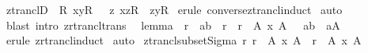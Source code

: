 \begin{isabellebody}
\isamarkupfalse%
%
\endisatagproof
{\isafoldproof}%
%
\isadelimproof
\isanewline
%
\endisadelimproof
\isanewline
{}\isamarkupfalse%
\ ztranclD\ {\isacharcolon}\ {\isachardoublequoteopen}{\isacharbang}{\isacharbang}R{\isachardot}\ {\isacharparenleft}x{\isacharcomma}y{\isacharparenright}{\isacharcolon}R{\isacharpercent}{\isacharplus}\ {\isacharequal}{\isacharequal}{\isachargreater}\ {\isacharquery}\ z{\isachardot}\ {\isacharparenleft}x{\isacharcomma}z{\isacharparenright}{\isacharcolon}R\ {\isacharampersand}\ {\isacharparenleft}z{\isacharcomma}y{\isacharparenright}{\isacharcolon}R{\isacharpercent}{\isacharasterisk}{\isachardoublequoteclose}\isanewline
%
\isadelimproof
%
\endisadelimproof
%
\isatagproof
{}\isamarkupfalse%
\ {\isacharparenleft}erule\ converse{\isacharunderscore}ztrancl{\isacharunderscore}induct{\isacharparenright}\isanewline
{}\isamarkupfalse%
\ auto\isanewline
{}\isamarkupfalse%
\ {\isacharparenleft}blast\ intro{\isacharcolon}\ zrtrancl{\isacharunderscore}trans{\isacharparenright}\ \isanewline
{}\isamarkupfalse%
%
\endisatagproof
{\isafoldproof}%
%
\isadelimproof
\isanewline
%
\endisadelimproof
\isanewline
{}\isamarkupfalse%
\ lemma{}{\isacharcolon}\ \ {\isachardoublequoteopen}{\isacharbang}{\isacharbang}r{\isachardot}\ {\isacharbrackleft}{\isacharbar}\ {\isacharparenleft}a{\isacharcomma}b{\isacharparenright}\ {\isacharcolon}\ r{\isacharpercent}{\isacharasterisk}{\isacharsemicolon}\ \ r\ {\isacharless}{\isacharequal}\ A\ {\isacharpercent}x\ A\ {\isacharbar}{\isacharbrackright}\ {\isacharequal}{\isacharequal}{\isachargreater}\ a{\isacharequal}b\ {\isacharbar}\ a{\isacharcolon}A{\isachardoublequoteclose}\isanewline
%
\isadelimproof
%
\endisadelimproof
%
\isatagproof
{}\isamarkupfalse%
\ {\isacharparenleft}erule\ zrtrancl{\isacharunderscore}induct{\isacharparenright}\isanewline
{}\isamarkupfalse%
\ auto\isanewline
{}\isamarkupfalse%
%
\endisatagproof
{\isafoldproof}%
%
\isadelimproof
\isanewline
%
\endisadelimproof
\isanewline
{}\isamarkupfalse%
\ ztrancl{\isacharunderscore}subset{\isacharunderscore}Sigma{\isacharcolon}\ {\isachardoublequoteopen}{\isacharbang}{\isacharbang}r{\isachardot}\ r\ {\isacharless}{\isacharequal}\ A\ {\isacharpercent}x\ A\ {\isacharequal}{\isacharequal}{\isachargreater}\ r{\isacharpercent}{\isacharplus}\ {\isacharless}{\isacharequal}\ A\ {\isacharpercent}x\ A{\isachardoublequoteclose}\isanewline
%
\isadelimproof
%
\endisadelimproof
%
\isatagproof

\end{isabellebody}
